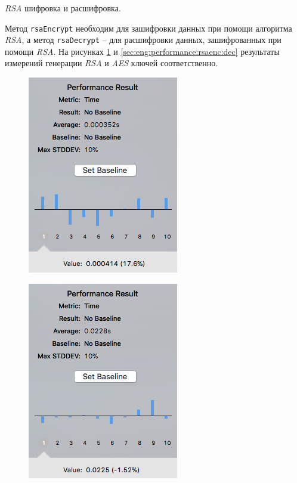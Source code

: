 \subsubsection{} \textit{RSA} шифровка и расшифровка.
\label{sec:eng:performance:rsaenc}

Метод \texttt{rsaEncrypt} необходим для зашифровки данных при помощи алгоритма \textit{RSA}, а метод \texttt{rsaDecrypt} -- для расшифровки данных, зашифрованных при помощи \textit{RSA}. На рисунках \ref{sec:eng:performance:rsaenc:enc} и \ref{sec:eng:performance:rsaenc:dec} результаты измерений генерации \textit{RSA} и \textit{AES} ключей соответственно.

\begin{figure}[h]
\centering
\begin{minipage}{.5\textwidth}
  \centering
  \includegraphics[width=.65\linewidth]{inc/img/perf/testRSAEncryptPerformance.png}
  \label{sec:eng:performance:rsaenc:enc}
\end{minipage}%
\begin{minipage}{.5\textwidth}
  \centering
  \includegraphics[width=.65\linewidth]{inc/img/perf/testRSADecryptPerformance.png}

\end{minipage}
\end{figure}
